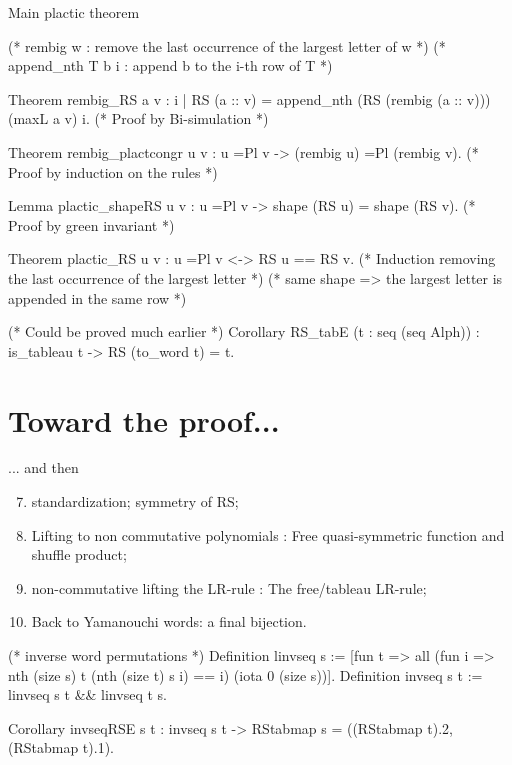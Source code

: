 \documentclass[compress,11pt]{beamer}
\begin{document}
\begin{frame}[fragile]{Main plactic theorem}

  \begin{coqcode}
(* rembig w : remove the last occurrence of the largest letter of w *)
(* append_nth T b i : append b to the i-th row of T *)

Theorem rembig_RS a v :
  {i | RS (a :: v) = append_nth (RS (rembig (a :: v))) (maxL a v) i}.
(* Proof by Bi-simulation *)

Theorem rembig_plactcongr u v : u =Pl v -> (rembig u) =Pl (rembig v).
(* Proof by induction on the rules *)

Lemma plactic_shapeRS u v : u =Pl v -> shape (RS u) = shape (RS v).
(* Proof by green invariant *)

Theorem plactic_RS u v : u =Pl v <-> RS u == RS v.
(* Induction removing the last occurrence of the largest letter *)
(* same shape => the largest letter is appended in the same row *)

(* Could be proved much earlier *)
Corollary RS_tabE (t : seq (seq Alph)) : is_tableau t -> RS (to_word t) = t.
  \end{coqcode}
\end{frame}

\section{Toward the proof...}
\begin{frame}[fragile]{... and then}

  \begin{enumerate}
    \setcounter{enumi}{6}
  \item standardization; symmetry of RS;
  \item Lifting to non commutative polynomials : Free quasi-symmetric function
    and shuffle product;
  \item non-commutative lifting the LR-rule : The free/tableau LR-rule;
  \item Back to Yamanouchi words: a final bijection.
  \end{enumerate}

  \begin{coqcode}
(* inverse word permutations *)
Definition linvseq s :=
  [fun t => all (fun i => nth (size s) t (nth (size t) s i) == i) 
    (iota 0 (size s))].
Definition invseq s t := linvseq s t && linvseq t s.

Corollary invseqRSE s t :
  invseq s t -> RStabmap s = ((RStabmap t).2, (RStabmap t).1).
  \end{coqcode}
\end{frame}
\end{document}
